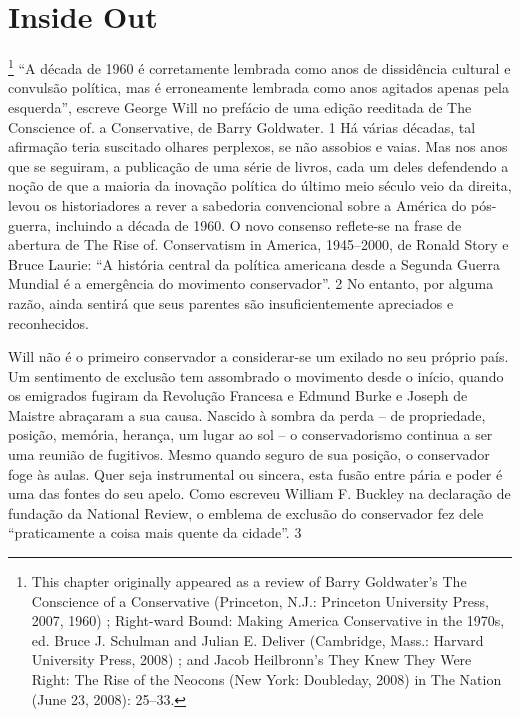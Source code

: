  
 \chapter{Inside Out}  

 \label{Inside Out}  
 
 
\par
 
 
 \textit{	}  

 
\par
 
 
 
\par
 

 \textbf{\textit{	} }  

 
\par
 

 \footnote{This chapter originally appeared as a review of Barry Goldwater’s The Conscience of a Conservative (Princeton, N.J.: Princeton University Press, 2007, 1960) ; Right-ward Bound: Making America Conservative in the 1970s, ed. Bruce J. Schulman and Julian E. Deliver (Cambridge, Mass.: Harvard University Press, 2008) ; and Jacob Heilbronn’s They Knew They Were Right: The Rise of the Neocons (New York: Doubleday, 2008) in The Nation (June 23, 2008): 25–33.}  
“A década de 1960 é corretamente lembrada como anos de dissidência cultural e convulsão política, mas é erroneamente lembrada como anos agitados apenas pela esquerda”, escreve George Will no prefácio de uma edição reeditada de The Conscience of. a Conservative, de Barry Goldwater.
 {\color{blue} 1}  
Há várias décadas, tal afirmação teria suscitado olhares perplexos, se não assobios e vaias. Mas nos anos que se seguiram, a publicação de uma série de livros, cada um deles defendendo a noção de que a maioria da inovação política do último meio século veio da direita, levou os historiadores a rever a sabedoria convencional sobre a América do pós-guerra, incluindo a década de 1960. O novo consenso reflete-se na frase de abertura de The Rise of. Conservatism in America, 1945–2000, de Ronald Story e Bruce Laurie: “A história central da política americana desde a Segunda Guerra Mundial é a emergência do movimento conservador”.
 {\color{blue} 2}  
No entanto, por alguma razão, ainda sentirá que seus parentes são insuficientemente apreciados e reconhecidos.
 
\par
 
Will não é o primeiro conservador a considerar-se um exilado no seu próprio país. Um sentimento de exclusão tem assombrado o movimento desde o início, quando os emigrados fugiram da Revolução Francesa e Edmund Burke e Joseph de Maistre abraçaram a sua causa. Nascido à sombra da perda – de propriedade, posição, memória, herança, um lugar ao sol – o conservadorismo continua a ser uma reunião de fugitivos. Mesmo quando seguro de sua posição, o conservador foge às aulas. Quer seja instrumental ou sincera, esta fusão entre pária e poder é uma das fontes do seu apelo. Como escreveu William F. Buckley na declaração de fundação da National Review, o emblema de exclusão do conservador fez dele “praticamente a coisa mais quente da cidade”.
 {\color{blue} 3}  

